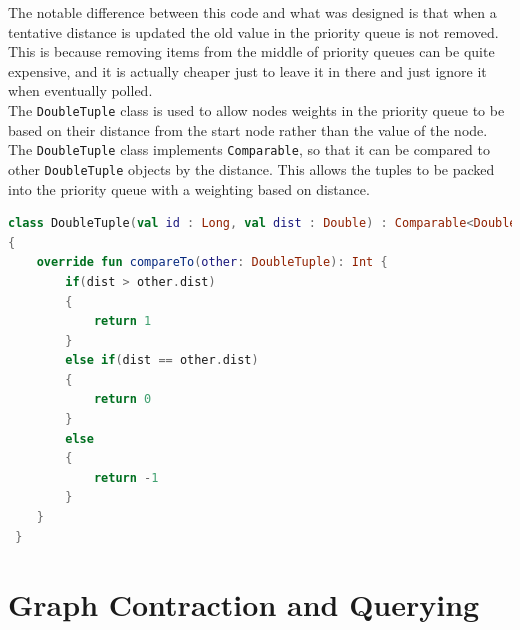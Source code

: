 \documentclass[11pt,twoside,a4paper]{report}
\begin{document}
The notable difference between this code and what was designed is that when a tentative distance is updated the old value in the priority queue is not removed. This is because removing items from the middle of priority queues can be quite expensive,
and it is actually cheaper just to leave it in there and just ignore it when eventually polled.\\
The \texttt{DoubleTuple} class is used to allow nodes weights in the priority queue to be based on their distance from the start node rather than the value of the node. The \texttt{DoubleTuple} class implements \texttt{Comparable}, 
so that it can be compared to other \texttt{DoubleTuple} objects by the distance. This allows the tuples to be packed into the priority queue with a weighting based on distance.
\begin{lstlisting}[language=kotlin]
class DoubleTuple(val id : Long, val dist : Double) : Comparable<DoubleTuple>
{
    override fun compareTo(other: DoubleTuple): Int {
        if(dist > other.dist)
        {
            return 1
        }
        else if(dist == other.dist)
        {
            return 0
        }
        else
        {
            return -1
        }
    }
 }
\end{lstlisting}
\newpage
\section{Graph Contraction and Querying}
\end{document}
